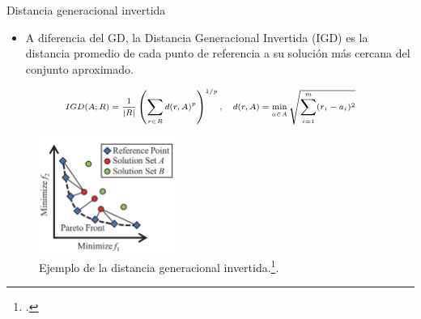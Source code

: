 \documentclass{beamer}
\begin{document}
\begin{frame}{Distancia generacional invertida}
\begin{itemize}
\justifying
\scriptsize
\item A diferencia del GD, la Distancia Generacional Invertida (IGD) es la distancia promedio de cada punto de referencia a su solución más cercana del conjunto aproximado.
\end{itemize}
\begin{equation*}
\scriptsize
\begin{split}
IGD(A; R) = \frac{1}{|R|} \left (   \sum_{r \in R} d(r, A)^p \right)^{1/p}, \quad d(r, A) = \min_{a \in A} \sqrt{\sum_{i=1}^m (r_i - a_i)^2}
\end{split}
\end{equation*}

\begin{figure}[H]
\centering
\includegraphics[width=0.4\textwidth]{igd_1.png}
\caption{\scriptsize Ejemplo de la distancia generacional invertida.\footcite{ishibuchi2016sensitivity}.}
\end{figure}
\end{frame}
\end{document}
